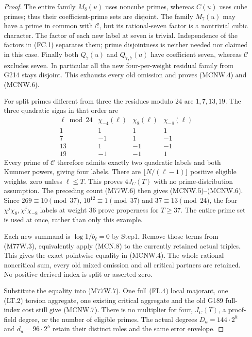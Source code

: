 \begin{proof}
The entire family $M_8(u)$ uses noncube primes, whereas $C(u)$
uses cube primes; thus their coefficient-prime sets are disjoint.
The family $M_7(u)$ may have a prime in common with $\mathscr C$,
but its rational-seven factor is a nontrivial cubic character.
The factor of each new label at seven is trivial.
Independence of the factors in (FC.1) separates them; prime
disjointness is neither needed nor claimed in this case.
Finally both $Q_7(u)$ and $Q_{7,7}(u)$ have coefficient seven,
whereas $\mathscr C$ excludes seven. In particular all the new
four-per-weight residual family from G214 stays disjoint.
This exhausts every old omission and proves (MCNW.4) and (MCNW.6).

For split primes different from three the residues modulo $24$
are $1,7,13,19$. The three quadratic signs in that order are
\[
 \begin{array}{c|rrr}
 \ell\bmod24&\chi_{-4}(\ell)&\chi_8(\ell)&\chi_{-8}(\ell)\\\hline
 1&1&1&1\\
 7&-1&1&-1\\
 13&1&-1&-1\\
 19&-1&-1&1
 \end{array}\tag{MCNW.9}
\]
Every prime of $\mathscr C$ therefore admits exactly two
quadratic labels and both Kummer powers, giving four labels.
There are $\lfloor N/(\ell-1)\rfloor$ positive eligible weights,
zero unless $\ell\leq T$. This proves $4J_C(T)$ with no
prime-distribution assumption. The preceding count (M77W.6)
then gives (MCNW.5)--(MCNW.6).
Since $269\equiv10\pmod{37}$, $10^{12}\equiv1\pmod{37}$ and
$37\equiv13\pmod{24}$, the four $\chi^j\chi_8,\chi^j\chi_{-8}$
labels at weight $36$ prove properness for $T\geq37$.
The entire prime set is used at once, rather than only this example.

Each new summand is $\log1/b_\ell=0$ by Step1.
Remove those terms from (M77W.3), equivalently apply (MCN.8)
to the currently retained actual triples. This gives the exact
pointwise equality in (MCNW.4). The whole rational noncritical
sum, every old mixed omission and all critical partners are retained.
No positive derived index is split or asserted zero.

Substitute the equality into (M77W.7). One full (FL.4)
local majorant, one (LT.2) torsion aggregate, one existing
critical aggregate and the old G189 full-index cost still give
(MCNW.7). There is no multiplier for four, $J_C(T)$, a proof-field
degree, or the number of eligible primes.
The actual degrees $D_u=144\cdot2^h$ and $d_u=96\cdot2^h$
retain their distinct roles and the same error envelope.


\end{proof}
